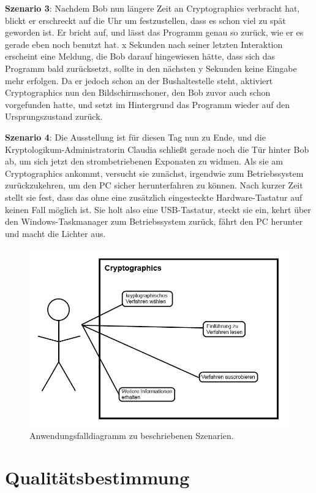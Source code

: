 \documentclass{article}
\begin{document}
\textbf{Szenario 3}:
Nachdem Bob nun längere Zeit an Cryptographics verbracht hat, blickt er erschreckt auf die Uhr um festzustellen, dass es schon viel zu spät geworden ist. Er bricht auf, und lässt das Programm genau so zurück, wie er es gerade eben noch benutzt hat. x Sekunden nach seiner letzten Interaktion erscheint eine Meldung, die Bob darauf hingewiesen hätte, dass sich das Programm bald zurücksetzt, sollte in den nächsten y Sekunden keine Eingabe mehr erfolgen. Da er jedoch schon an der Bushaltestelle steht, aktiviert Cryptographics nun den Bildschirmschoner, den Bob zuvor auch schon vorgefunden hatte, und setzt im Hintergrund das Programm wieder auf den Ursprungszustand zurück.

\textbf{Szenario 4}:
Die Ausstellung ist für diesen Tag nun zu Ende, und die Kryptologikum-Administratorin Claudia schließt gerade noch die Tür hinter Bob ab, um sich jetzt den strombetriebenen Exponaten zu widmen. Als sie am Cryptographics ankommt, versucht sie zunächst, irgendwie zum Betriebssystem zurückzukehren, um den PC sicher herunterfahren zu können. Nach kurzer Zeit stellt sie fest, dass das ohne eine zusätzlich eingesteckte Hardware-Tastatur auf keinen Fall möglich ist. Sie holt also eine USB-Tastatur, steckt sie ein, kehrt über den Windows-Taskmanager zum Betriebssystem zurück, fährt den PC herunter und macht die Lichter aus.

\begin{figure}[h!]
  \centering
    \includegraphics[width=\textwidth]{resources/usecase1}
  \caption{Anwendungsfalldiagramm zu beschriebenen Szenarien.}
\end{figure}

\section{Qualitätsbestimmung}
\end{document}
